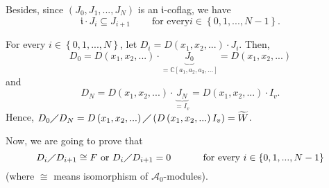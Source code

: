 \documentclass[etingof-lie.tex]{subfiles}
\begin{document}
Besides, since $\left(  J_{0},J_{1},...,J_{N}\right)  $ is an $\mathfrak{i}%
$-coflag, we have%
\begin{equation}
\mathfrak{i}\cdot J_{i}\subseteq J_{i+1}\ \ \ \ \ \ \ \ \ \ \text{for every
}i\in\left\{  0,1,...,N-1\right\}  . \label{prop.V=F(X)U.pf.2}%
\end{equation}


For every $i\in\left\{  0,1,...,N\right\}  $, let $D_{i}=D\left(  x_{1}%
,x_{2},...\right)  \cdot J_{i}$. Then,%
\[
D_{0}=D\left(  x_{1},x_{2},...\right)  \cdot\underbrace{J_{0}}_{=\mathbb{C}%
\left[  a_{1},a_{2},a_{3},...\right]  }=D\left(  x_{1},x_{2},...\right)
\]
and%
\[
D_{N}=D\left(  x_{1},x_{2},...\right)  \cdot\underbrace{J_{N}}_{=I_{v}%
}=D\left(  x_{1},x_{2},...\right)  \cdot I_{v}.
\]
Hence, $D_{0}\diagup D_{N}=D\left(  x_{1},x_{2},...\right)  \diagup\left(
D\left(  x_{1},x_{2},...\right)  I_{v}\right)  =\widetilde{W}$.

Now, we are going to prove that%
\begin{equation}
D_{i}\diagup D_{i+1}\cong F\text{ or }D_{i}\diagup D_{i+1}%
=0\ \ \ \ \ \ \ \ \ \ \text{for every }i\in\left\{  0,1,...,N-1\right\}
\label{prop.V=F(X)U.pf.3}%
\end{equation}
(where $\cong$ means isomorphism of $\mathcal{A}_{0}$-modules).
\end{document}
